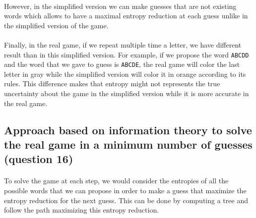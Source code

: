 \documentclass[a4paper, 11pt, oneside]{article}
\begin{document}
\paragraph{}However, in the simplified version we can make guesses that are not existing words which allows to have a maximal entropy reduction at each guess unlike in the simplified version of the game.

\paragraph{}Finally, in the real game, if we repeat multiple time a letter, we have different result than in this simplified version. For example, if we propose the word \texttt{ABCDD} and the word that we gave to guess is \texttt{ABCDE}, the real game will color the last letter in gray while the simplified version will color it in orange according to its rules. This difference makes that entropy might not represents the true uncertainty about the game in the simplified version while it is more accurate in the real game.

\subsection{Approach based on information theory to solve the real game in a minimum number of guesses (question 16)}

\paragraph{}To solve the game at each step, we would consider the entropies of all the possible words that we can propose in order to make a guess that maximize the entropy reduction for the next guess. This can be done by computing a tree and follow the path maximizing this entropy reduction.

\end{document}
